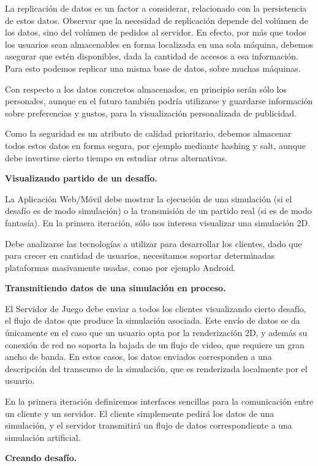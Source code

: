 \documentclass[a4paper, 10pt, twoside]{article}
\begin{document}
La replicación de datos es un factor a considerar, relacionado con la persistencia de estos datos. Observar que la necesidad de replicación depende del volúmen de los datos, sino del volúmen de pedidos al servidor. En efecto, por más que todos los usuarios sean almacenables en forma localizada en una sola máquina, debemos asegurar que estén disponibles, dada la cantidad de accesos a esa información. Para esto podemos replicar una misma base de datos, sobre muchas máquinas.

Con respecto a los datos concretos almacenados, en principio serán sólo los personales, aunque en el futuro también podría utilizarse y guardarse información sobre preferencias y gustos, para la visualización personalizada de publicidad.

Como la seguridad es un atributo de calidad prioritario, debemos almacenar todos estos datos en forma segura, por ejemplo mediante hashing y salt, aunque debe invertirse cierto tiempo en estudiar otras alternativas.

\textbf{Visualizando partido de un desafío.}

La Aplicación Web/Móvil debe mostrar la ejecución de una simulación (si el desafío es de modo simulación) o la transmisión de un partido real (si es de modo fantasía). En la primera iteración, sólo nos interesa visualizar una simulación 2D.

Debe analizarse las tecnologías a utilizar para desarrollar los clientes, dado que para crecer en cantidad de usuarios, necesitamos soportar determinadas plataformas masivamente usadas, como por ejemplo Android.

\textbf{Transmitiendo datos de una simulación en proceso.}

El Servidor de Juego debe enviar a todos los clientes visualizando cierto desafío, el flujo de datos que produce la simulación asociada. Este envío de datos se da únicamente en el caso que un usuario opta por la renderización 2D, y además su conexión de red no soporta la bajada de un flujo de video, que requiere un gran ancho de banda. En estos casos, los datos enviados corresponden a una descripción del transcurso de la simulación, que es renderizada localmente por el usuario.

En la primera iteración definiremos interfaces sencillas para la comunicación entre un cliente y un servidor. El cliente simplemente pedirá los datos de una simulación, y el servidor transmitirá un flujo de datos correspondiente a una simulación artificial.

\textbf{Creando desafío.}
\end{document}
